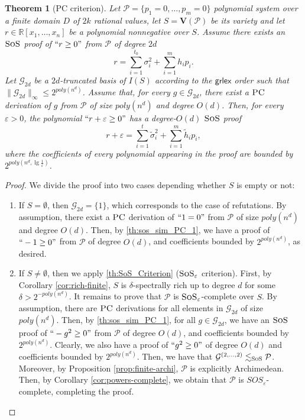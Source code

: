 \documentclass[11pt]{article}
\newcommand{\sos}{\text{\sc{SoS}}}
\newcommand{\PC}{\textsc{PC}}
\newcommand{\grlexns}{\textsf{grlex}}
\newcommand{\Variety}[1]{{\textbf{V}}\left( #1 \right)}
\newcommand{\1}{\textbf{1}}
\newcommand{\GB}{\text{Gr\"{o}bner} }
\newtheorem{theorem}{Theorem}[section]
\begin{document}
\begin{theorem}[PC criterion]\label{th:PC_criterion}
    Let $\mathcal{P} = \{p_1 = 0, \dots, p_m = 0\}$ polynomial system over a finite domain $D$ of $2k$ rational values, let $S=\Variety{\mathcal{P}}$ be its variety and let $r\in\mathbb{R}[x_1, \dots, x_n]$ be a polynomial nonnegative over $S$. Assume there exists an $\sos$ proof of $``r\geq 0"$ from $\mathcal{P}$ of degree $2d$
  \begin{equation*}
        r = \sum_{i=1}^{t_0} \sigma_i^2 + \sum_{i=1}^m h_i p_i.
    \end{equation*}
   Let $\mathcal{G}_{2d}$ be a $2d$-truncated \GB basis of $I(S)$ according to the $\grlexns$ order such that $\|\mathcal{G}_{2d}\|_{\infty}\leq 2^{poly(n^d)}$. Assume that, for every $g\in \mathcal{G}_{2d}$, there exist a $\PC$ derivation of $g$ from $\mathcal{P}$ of size $poly(n^d)$ and degree $O(d)$. Then, for every $\varepsilon>0$, the polynomial $``r+\varepsilon \geq 0"$ has a degree-$O(d)$ $\sos$ proof
    \begin{equation*}
        r +\varepsilon = \sum_{i=1}^{t} \tilde{\sigma}_i^2 + \sum_{i=1}^m \tilde{h}_i p_i,
    \end{equation*}
    where the coefficients of every polynomial appearing in the proof are bounded by $2^{poly(n^d, \lg \frac{1}{\varepsilon})}$.   
\end{theorem}
\begin{proof}
    We divide the proof into two cases depending whether $S$ is empty or not: 
    \begin{enumerate}
        \item If $S = \emptyset$, then $\mathcal{G}_{2d} = \{ 1 \}$, which corresponds to the case of refutations. By assumption, there exist a $\PC$ derivation of $``1=0"$ from $\mathcal{P}$ of size $poly(n^d)$ and degree $O(d)$. Then, by \cref{th:sos_sim_PC_1}, we have a proof of $``-1\geq 0"$ from $\mathcal{P}$ of degree $O(d)$, and coefficients bounded by $2^{poly(n^d)}$, as desired.
        \item If $S\neq \emptyset$, then we apply \cref{th:SoS_Criterion} ($\sos_\varepsilon$ criterion). First, by Corollary \ref{cor:rich-finite}, $S$ is $\delta$-spectrally rich up to degree $d$ for some $\delta>2^{-poly(n^d)}$. It remains to prove that $\mathcal{P}$ is $\sos_{\varepsilon}$-complete over $S$. By assumption, there are $\PC$ derivations for all elements in $\mathcal G_{2d}$ of size $poly(n^d)$. Then, by \cref{th:sos_sim_PC_1}, for all $g\in \mathcal{G}_{2d}$, we have an $\sos$ proof of $``-g^2\geq 0"$ from $\mathcal{P}$ of degree $O(d)$, and coefficients bounded by $2^{poly(n^d)}$. Clearly, we also have a proof of $``g^2\geq 0"$ of degree $O(d)$ and coefficients bounded by $2^{poly(n^d)}$. Then, we have that $\mathcal{G}^{(2, \dots, 2)}\lesssim_{\sos} \mathcal{P}$. Moreover, by Proposition \ref{prop:finite-archi}, $\mathcal{P}$ is explicitly Archimedean. Then, by Corollary \ref{cor:powers-complete}, we obtain that $\mathcal{P}$ is $SOS_{\varepsilon}$-complete, completing the proof.
        \end{enumerate}
\end{proof}
\end{document}
